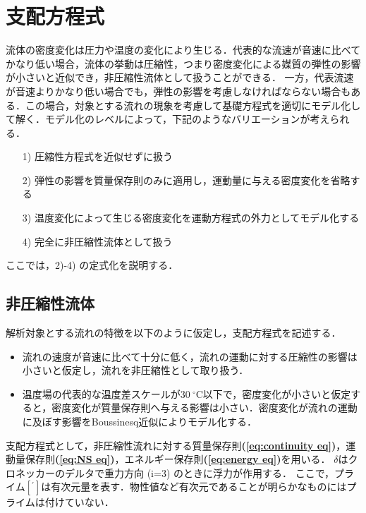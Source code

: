 \graphicspath{{./fig_Eq/}}

\section{支配方程式}
\label{sec:basic eqs}
流体の密度変化は圧力や温度の変化により生じる．代表的な流速が音速に比べてかなり低い場合，流体の挙動は圧縮性，つまり密度変化による媒質の弾性の影響が小さいと近似でき，非圧縮性流体として扱うことができる．
一方，代表流速が音速よりかなり低い場合でも，弾性の影響を考慮しなければならない場合もある．この場合，対象とする流れの現象を考慮して基礎方程式を適切にモデル化して解く．モデル化のレベルによって，下記のようなバリエーションが考えられる．

\begin{itemize}
\item[1)] 圧縮性方程式を近似せずに扱う~\cite{kotake:94:handbook}
\item[2)] 弾性の影響を質量保存則のみに適用し，運動量に与える密度変化を省略する
\item[3)] 温度変化によって生じる密度変化を運動方程式の外力としてモデル化する
\item[4)] 完全に非圧縮性流体として扱う
\end{itemize}
ここでは，2)-4) の定式化を説明する．

\subsection{非圧縮性流体}
解析対象とする流れの特徴を以下のように仮定し，支配方程式を記述する．

\begin{itemize}
\item 流れの速度が音速に比べて十分に低く，流れの運動に対する圧縮性の影響は小さいと仮定し，流れを非圧縮性として取り扱う．
\item 温度場の代表的な温度差スケールが$30\ {}^\circ\mathrm{C}$以下で，密度変化が小さいと仮定すると，密度変化が質量保存則へ与える影響は小さい．密度変化が流れの運動に及ぼす影響をBoussinesq近似によりモデル化する．
\end{itemize}

支配方程式として，非圧縮性流れに対する質量保存則\textbf{(\ref{eq:continuity eq})}，運動量保存則\textbf{(\ref{eq:NS eq})}，エネルギー保存則\textbf{(\ref{eq:energy eq})}を用いる．
$\delta$はクロネッカーのデルタで重力方向 (i=3) のときに浮力が作用する．
ここで，プライム$[{}^{\prime}]$は有次元量を表す．物性値など有次元であることが明らかなものにはプライムは付けていない．

